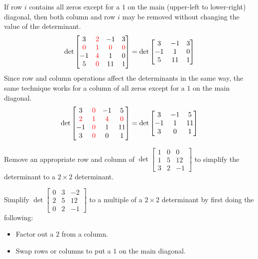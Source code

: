 \begin{fact}
If row \(i\) contains all zeros except for a \(1\) on the 
main (upper-left to lower-right) diagonal, 
then both column and row \(i\)
may be removed without changing the value of the determinant.
\[
  \det \begin{bmatrix}
    3 & \textcolor{red}{2} & -1 & 3 \\
    \textcolor{red}{0} & \textcolor{red}{1} 
      & \textcolor{red}{0} & \textcolor{red}{0} \\
    -1 & \textcolor{red}{4} & 1 & 0 \\
    5 & \textcolor{red}{0} & 11 & 1
  \end{bmatrix} =
  \det \begin{bmatrix}
    3 & -1 & 3 \\
    -1 & 1 & 0 \\
    5 & 11 & 1
  \end{bmatrix}
\]
Since row and column operations affect the determinants in the same
way, the same technique works for a column of all zeros except for
a \(1\) on the main diagonal.
\[
  \det \begin{bmatrix}
    3 & \textcolor{red}{0} & -1 & 5 \\
    \textcolor{red}{2} & \textcolor{red}{1} & \textcolor{red}{4} & 
       \textcolor{red}{0} \\
    -1 & \textcolor{red}{0} & 1 & 11 \\
    3 & \textcolor{red}{0} & 0 & 1
  \end{bmatrix} =
  \det \begin{bmatrix}
    3 & -1 & 5 \\
    -1 & 1 & 11 \\
    3 & 0 & 1
  \end{bmatrix}
\] 
\end{fact}


\begin{activity}{5}
  Remove an appropriate row and column of  
  $\det \begin{bmatrix} 1 & 0 & 0 \\ 1 & 5 & 12 \\ 3 & 2 & -1 \end{bmatrix}$
  to simplify the determinant to a \(2\times 2\) determinant.
\end{activity}

\begin{activity}{5}
  Simplify
  \(\det \begin{bmatrix} 0 & 3 & -2 \\ 2 & 5 & 12 \\ 0 & 2 & -1 \end{bmatrix}\)
  to a multiple of a \(2\times 2\) determinant by first doing the following:
  \begin{itemize}
    \item Factor out a \(2\) from a column.
    \item Swap rows or columns to put a \(1\) on the main diagonal.
  \end{itemize}
\end{activity}

